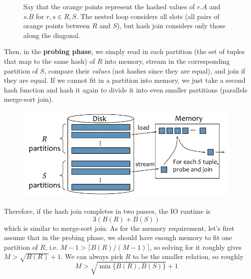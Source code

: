 \begin{definition}
\begin{figure}[H]
        \caption{Say that the orange points represent the hashed values of $r.A$ and $s.B$ for $r, s \in R, S$. The nested loop considers all slots (all pairs of orange points between $R$ and $S$), but hash join considers only those along the diagonal. } 
        \label{fig:hash_join}
      \end{figure}

      Then, in the \textbf{probing phase}, we simply read in each partition (the set of tuples that map to the same hash) of $R$ into memory, stream in the corresponding partition of $S$, compare their \textit{values} (not hashes since they are equal), and join if they are equal. If we cannot fit in a partition into memory, we just take a second hash function and hash it again to divide it into even smaller partitions (parallels merge-sort join). 

      \begin{figure}[H]
        \centering 
        \includegraphics[scale=0.4]{img/hash_join2.png}
        \caption{} 
        \label{fig:hash_join2}
      \end{figure}

      Therefore, if the hash join completes in two passes, the IO runtime is 
      \begin{equation}
        3 ( B(R) + B(S)) 
      \end{equation}
      which is similar to merge-sort join. As for the memory requirement, let's first assume that in the probing phase, we should have enough memory to fit one partition of $R$, i.e. $M-1 > \lceil B(R) / (M-1) \rceil$, so solving for it roughly gives $M > \sqrt{B(R)} + 1$. We can always pick $R$ to be the smaller relation, so roughly 
      \begin{equation}
        M > \sqrt{\min\{ B(R), B(S)\}} + 1
      \end{equation}
    \end{definition}

